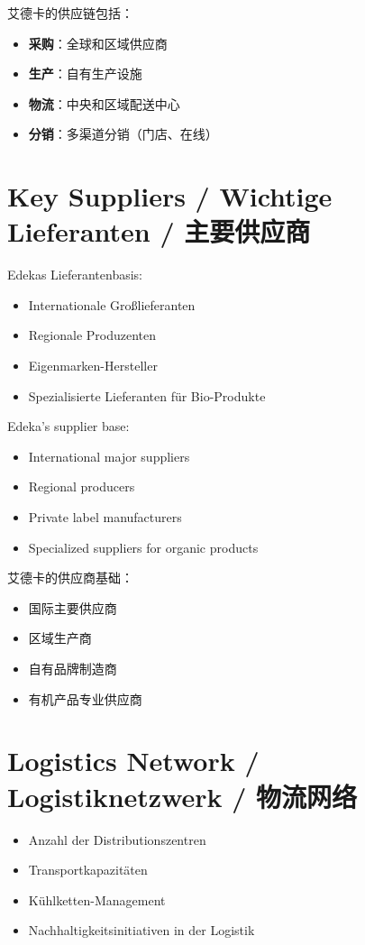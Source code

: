艾德卡的供应链包括：
\begin{itemize}
    \item \textbf{采购}：全球和区域供应商
    \item \textbf{生产}：自有生产设施
    \item \textbf{物流}：中央和区域配送中心
    \item \textbf{分销}：多渠道分销（门店、在线）
\end{itemize}

\section{Key Suppliers / Wichtige Lieferanten / 主要供应商}

\begin{otherlanguage}{ngerman}
Edekas Lieferantenbasis:
\begin{itemize}
    \item Internationale Großlieferanten
    \item Regionale Produzenten
    \item Eigenmarken-Hersteller
    \item Spezialisierte Lieferanten für Bio-Produkte
\end{itemize}
\end{otherlanguage}

Edeka's supplier base:
\begin{itemize}
    \item International major suppliers
    \item Regional producers
    \item Private label manufacturers
    \item Specialized suppliers for organic products
\end{itemize}

艾德卡的供应商基础：
\begin{itemize}
    \item 国际主要供应商
    \item 区域生产商
    \item 自有品牌制造商
    \item 有机产品专业供应商
\end{itemize}

\section{Logistics Network / Logistiknetzwerk / 物流网络}

\begin{otherlanguage}{ngerman}
\begin{itemize}
    \item Anzahl der Distributionszentren
    \item Transportkapazitäten
    \item Kühlketten-Management
    \item Nachhaltigkeitsinitiativen in der Logistik
\end{itemize}
\end{otherlanguage}

